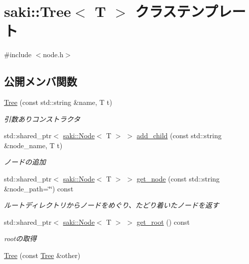 \hypertarget{classsaki_1_1_tree}{}\section{saki\+:\+:Tree$<$ T $>$ クラステンプレート}
\label{classsaki_1_1_tree}


{\ttfamily \#include $<$node.\+h$>$}

\subsection*{公開メンバ関数}
\begin{DoxyCompactItemize}
\item 
\mbox{\hyperlink{classsaki_1_1_tree_a3b755ca793a3e3c9dd6e0aee77bf7bd6}{Tree}} (const std\+::string \&name, T t)
\begin{DoxyCompactList}\small\item\em 引数ありコンストラクタ \end{DoxyCompactList}\item 
std\+::shared\+\_\+ptr$<$ \mbox{\hyperlink{classsaki_1_1_node}{saki\+::\+Node}}$<$ T $>$ $>$ \mbox{\hyperlink{classsaki_1_1_tree_a70b7296cf65702fc2fcec030e61e7178}{add\+\_\+child}} (const std\+::string \&node\+\_\+name, T t)
\begin{DoxyCompactList}\small\item\em ノードの追加 \end{DoxyCompactList}\item 
std\+::shared\+\_\+ptr$<$ \mbox{\hyperlink{classsaki_1_1_node}{saki\+::\+Node}}$<$ T $>$ $>$ \mbox{\hyperlink{classsaki_1_1_tree_aa2ec0572a065296f4cb1448ab9916944}{get\+\_\+node}} (const std\+::string \&node\+\_\+path=\char`\"{}\char`\"{}) const
\begin{DoxyCompactList}\small\item\em ルートディレクトリからノードをめぐり、たどり着いたノードを返す \end{DoxyCompactList}\item 
std\+::shared\+\_\+ptr$<$ \mbox{\hyperlink{classsaki_1_1_node}{saki\+::\+Node}}$<$ T $>$ $>$ \mbox{\hyperlink{classsaki_1_1_tree_a7f55efb5bfb32ce87844d6c0682a06a4}{get\+\_\+root}} () const
\begin{DoxyCompactList}\small\item\em rootの取得 \end{DoxyCompactList}\item 
\mbox{\hyperlink{classsaki_1_1_tree_a3716d7484b92161bbb38c362280358c0}{Tree}} (const \mbox{\hyperlink{classsaki_1_1_tree}{Tree}} \&other)

\end{DoxyCompactItemize}

